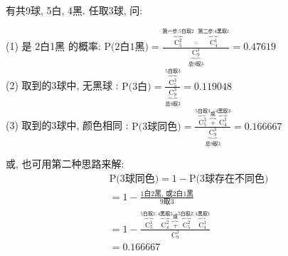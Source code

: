 \documentclass[UTF8]{ctexart}
\begin{document}
	
	
	\begin{myEnvSample}
		有共9球, 5白, 4黑. 任取3球, 问:
		
		(1) 是 2白1黑 的概率: 		
		$
		\text{P(2白1黑)}=\frac{\overset{\text{第一步:5白取}2}{\overbrace{\text{C}_{5}^{2}}}\cdot \overset{\text{第二步:4黑取}1}{\overbrace{\text{C}_{4}^{1}}}}{\underset{\text{总9取}3}{\underbrace{\text{C}_{9}^{3}}}}=0.47619
		$ \\
		
		(2) 取到的3球中, 无黑球 :		
		$
		\text{P(3白)}=\frac{\overset{5\text{白取}3}{\overbrace{\text{C}_{5}^{3}}}}{\underset{\text{总9取}3}{\underbrace{\text{C}_{9}^{3}}}}=0.119048
		$ \\
		
		(3) 取到的3球中, 颜色相同 : 		
		$
		\text{P(3球同色)}=\frac{\overset{5\text{白取}3}{\overbrace{\text{C}_{5}^{3}}}\overset{\text{或}}{\overbrace{+}}\overset{4\text{黑取}3}{\overbrace{\text{C}_{4}^{3}}}}{\underset{\text{总9取}3}{\underbrace{\text{C}_{9}^{3}}}}=0.166667
		$
		
		或, 也可用第二种思路来解:  		
		\begin{align*}  %
			&\text{P(3球同色)}=1-\text{P(3球存在不同色)}\\
			&=1-\frac{1\text{白2黑,\ 或2白1黑}}{9\text{取}3}\\
			&=1-\frac{\overset{5\text{白取}1; }{\overbrace{\text{C}_{5}^{1}}}\overset{4\text{黑取}2}{\overbrace{\text{C}_{4}^{2}}}\overset{\text{或}}{\overbrace{+}}\overset{5\text{白取}2; }{\overbrace{\text{C}_{5}^{2}}}\overset{4\text{黑取}1}{\overbrace{\text{C}_{4}^{1}}}}{\text{C}_{9}^{3}}\\
			&=0.166667
		\end{align*}
		
	\end{myEnvSample}
	
	
	
	
	
	
	
	
\end{document}
